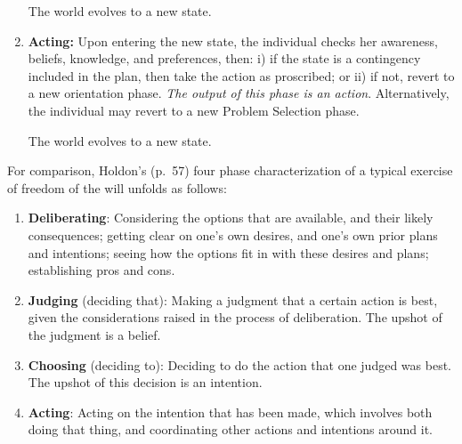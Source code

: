 \documentclass[
11pt,
titlepage,
reqno,
]{article}%
\theoremstyle{definition}
\begin{document}
\begin{enumerate}
	The world evolves to a new state.
	
	\item \textbf{Acting:} 
	Upon entering the new state, the individual checks her  awareness, beliefs, knowledge, and preferences, then: i) if the state is a contingency included in the plan, then take the action as proscribed; or ii) if not, revert to a new orientation phase.
	\textit{The output of this phase is an action}.
	Alternatively, the individual may revert to a  new Problem Selection phase.
	
	The world evolves to a new state.
\end{enumerate}

For comparison, Holdon's (p.\ 57) four phase characterization of a typical exercise of freedom of the will unfolds as follows: 
\begin{enumerate}
	\item \textbf{Deliberating}: Considering the options that are available, and their likely consequences; getting clear on one’s own desires, and one’s own prior plans and intentions; seeing how the options ﬁt in with these desires and plans; establishing pros and cons. 
	\item \textbf{Judging} (deciding that): Making a judgment that a certain action is best, given the considerations raised in the process of deliberation. 
	The upshot of the judgment is a belief. 
	\item \textbf{Choosing} (deciding to): Deciding to do the action that one judged was best. 
	The upshot of this decision is an intention. 
	\item \textbf{Acting}: Acting on the intention that has been made, which involves both doing that thing, and coordinating other actions and intentions around it.
\end{enumerate}
\end{document}
